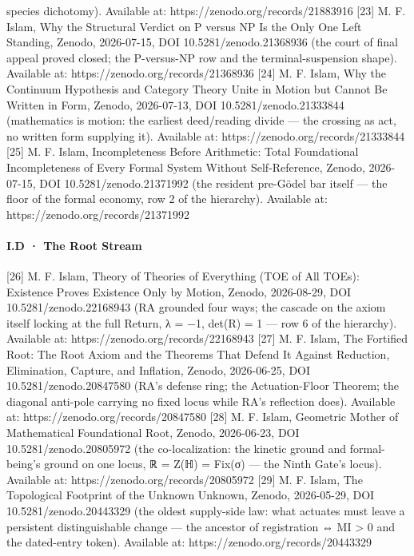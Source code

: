 \documentclass[10pt]{article}
\renewcommand{\_}{\origunderscore\allowbreak}
\begin{document}
species dichotomy). Available at: https://zenodo.org/records/21883916
{[}23{]} M. F. Islam, Why the Structural Verdict on P versus NP Is the
Only One Left Standing, Zenodo, 2026-07-15, DOI 10.5281/zenodo.21368936
(the court of final appeal proved closed; the P-versus-NP row and the
terminal-suspension shape). Available at:
https://zenodo.org/records/21368936 {[}24{]} M. F. Islam, Why the
Continuum Hypothesis and Category Theory Unite in Motion but Cannot Be
Written in Form, Zenodo, 2026-07-13, DOI 10.5281/zenodo.21333844
(mathematics is motion: the earliest deed/reading divide --- the
crossing as act, no written form supplying it). Available at:
https://zenodo.org/records/21333844 {[}25{]} M. F. Islam, Incompleteness
Before Arithmetic: Total Foundational Incompleteness of Every Formal
System Without Self-Reference, Zenodo, 2026-07-15, DOI
10.5281/zenodo.21371992 (the resident pre-Gödel bar itself --- the floor
of the formal economy, row 2 of the hierarchy). Available at:
https://zenodo.org/records/21371992

\hypertarget{i.d-the-root-stream}{%
\paragraph{I.D · The Root Stream}\label{i.d-the-root-stream}}

{[}26{]} M. F. Islam, Theory of Theories of Everything (TOE of All
TOEs): Existence Proves Existence Only by Motion, Zenodo, 2026-08-29,
DOI 10.5281/zenodo.22168943 (RA grounded four ways; the cascade on the
axiom itself locking at the full Return, λ = −1, det(R) = 1 --- row 6 of
the hierarchy). Available at: https://zenodo.org/records/22168943
{[}27{]} M. F. Islam, The Fortified Root: The Root Axiom and the
Theorems That Defend It Against Reduction, Elimination, Capture, and
Inflation, Zenodo, 2026-06-25, DOI 10.5281/zenodo.20847580 (RA's defense
ring; the Actuation-Floor Theorem; the diagonal anti-pole carrying no
fixed locus while RA's reflection does). Available at:
https://zenodo.org/records/20847580 {[}28{]} M. F. Islam, Geometric
Mother of Mathematical Foundational Root, Zenodo, 2026-06-23, DOI
10.5281/zenodo.20805972 (the co-localization: the kinetic ground and
formal-being's ground on one locus, ℝ = Z(ℍ) = Fix(σ) --- the Ninth
Gate's locus). Available at: https://zenodo.org/records/20805972
{[}29{]} M. F. Islam, The Topological Footprint of the Unknown Unknown,
Zenodo, 2026-05-29, DOI 10.5281/zenodo.20443329 (the oldest supply-side
law: what actuates must leave a persistent distinguishable change ---
the ancestor of registration ⇔ MI \textgreater{} 0 and the dated-entry
token). Available at: https://zenodo.org/records/20443329
\end{document}

